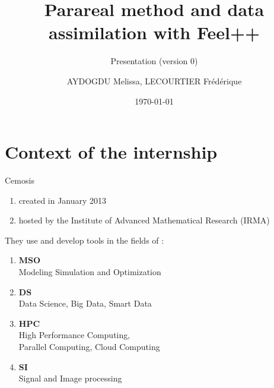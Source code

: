 \documentclass[10pt,xcolor={table,dvipsnames},t]{beamer}
\title[Lorenz]{Parareal method and data assimilation with Feel++}
\subtitle{Presentation (version 0)}
\author[name]{AYDOGDU Melissa, LECOURTIER Frédérique}
\institute{\large Strasbourg University}
\date{\today}
\begin{document}
	
	\begin{frame}
		\titlepage
	\end{frame}
	
	\AtBeginSection[]{
		\begin{frame}
			\vfill
			\centering
			\begin{beamercolorbox}[sep=5pt,shadow=true,rounded=true]{subtitle}
				\usebeamerfont{title}\insertsectionhead\par%
			\end{beamercolorbox}
			\vfill
		\end{frame}
	}


	\section{Context of the internship}

	\begin{frame}{Cemosis}
		
		\begin{minipage}{0.4\hsize}
			\centering
			\begin{enumerate}[$\rightarrow$]
				\item created in January 2013
				\item hosted by the Institute of Advanced Mathematical Research (IRMA)
			\end{enumerate}
		\end{minipage} \quad
		\begin{minipage}{0.5\hsize}
			They use and develop tools in the fields of : 
			\begin{enumerate}[\textbullet]
				\item \textbf{MSO} \\
				Modeling Simulation and Optimization
				\item \textbf{DS} \\
				Data Science, Big Data, Smart Data
				\item \textbf{HPC} \\
				High Performance Computing, \\
				Parallel Computing, Cloud Computing
				\item \textbf{SI} \\
				Signal and Image processing
			\end{enumerate}
		\end{minipage}
	
	\end{frame}
\end{document}
